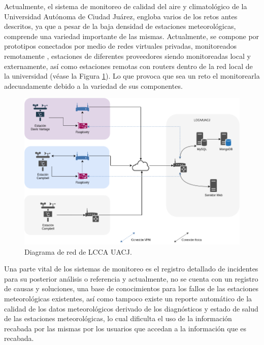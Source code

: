 
Actualmente, el sistema de monitoreo de calidad del aire y climatológico de la Universidad Autónoma de Ciudad Juárez, engloba varios de los retos antes descritos, ya que a pesar de la baja densidad de estaciones meteorológicas, comprende una variedad importante de las mismas. Actualmente, se compone por prototipos conectados por medio de redes virtuales privadas, monitoreados remotamente \cite{red_climatologica_uacj}, estaciones de diferentes proveedores siendo monitoreadas local y externamente, así como estaciones remotas con routers dentro de la red local de la universidad (véase la Figura \ref{fig:current_network}). Lo que provoca que sea un reto el monitorearla adecuadamente debido a la variedad de sus componentes.


\begin{figure}[!ht]
	\centering
	\includegraphics[width=.80\linewidth]{images/diagrams/red_lcca.drawio.png}
	\caption{Diagrama de red de LCCA UACJ.}
	\label{fig:current_network}
\end{figure}


Una parte vital de los sistemas de monitoreo es el registro detallado de incidentes para su posterior análisis o referencia y actualmente, no se cuenta con un registro de causas y soluciones, una base de conocimientos para los fallos de las estaciones meteorológicas existentes, así como tampoco existe un reporte automático de la calidad de los datos meteorológicos derivado de los diagnósticos y estado de salud de las estaciones meteorológicas, lo cual dificulta el uso de la información recabada por las mismas por los usuarios que accedan a la información que es recabada.


